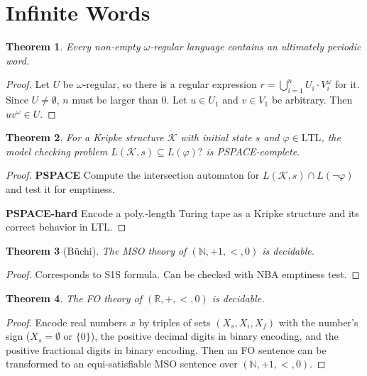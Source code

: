 \documentclass{article}
\newtheorem{theorem}{Theorem}[section]
\begin{document}
\section{Infinite Words}

\vspace{.5cm}
\begin{theorem}
	Every non-empty $\omega$-regular language contains an ultimately periodic word.
\end{theorem}
\begin{proof}
	Let $U$ be $\omega$-regular, so there is a regular expression $r = \bigcup_{i=1}^n U_i \cdot V_i^\omega$ for it. Since $U \neq \emptyset$, $n$ must be larger than 0. Let $u \in U_1$ and $v \in V_1$ be arbitrary. Then $u v^\omega \in U$.
\end{proof}


\vspace{.5cm}
\begin{theorem}
	For a Kripke structure $\mathcal{K}$ with initial state $s$ and $\varphi \in \text{LTL}$, the model checking problem $L(\mathcal{K}, s) \subseteq L(\varphi)?$ is PSPACE-complete.
\end{theorem}
\begin{proof}
	\textbf{PSPACE} Compute the intersection automaton for $L(\mathcal{K}, s) \cap L(\neg \varphi)$ and test it for emptiness.
	
	\textbf{PSPACE-hard} Encode a poly.-length Turing tape as a Kripke structure and its correct behavior in LTL.
\end{proof}

\vspace{.5cm}
\begin{theorem}[Büchi]
	The MSO theory of $(\mathbb{N}, +1, <, 0)$ is decidable.
\end{theorem}
\begin{proof}
	Corresponds to S1S formula. Can be checked with NBA emptiness test.
\end{proof}

\vspace{.5cm}
\begin{theorem}
	The FO theory of $(\mathbb{R}, +, <, 0)$ is decidable.
\end{theorem}
\begin{proof}
	Encode real numbers $x$ by triples of sets $(X_s, X_i, X_f)$ with the number's sign ($X_s = \emptyset$ or $\{0\}$), the positive decimal digits in binary encoding, and the positive fractional digits in binary encoding. Then an FO sentence can be transformed to an equi-satisfiable MSO sentence over $(\mathbb{N}, +1, <, 0)$.
\end{proof}
\end{document}

